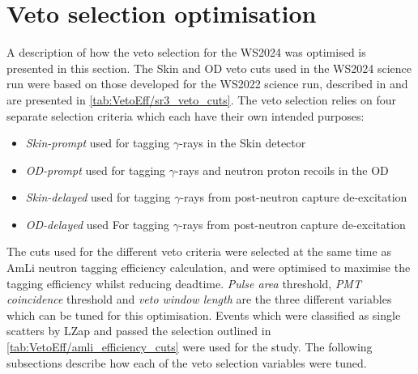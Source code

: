 \section{Veto selection optimisation}\label{sec:VetoEff/VetoSelectionOptimisation}
A description of how the veto selection for the WS2024 was optimised is presented in this section. The Skin and OD veto cuts used in the WS2024 science run were based on those developed for the WS2022 science run, described in \cite{LZCollaboration:2024lux} and are presented in \autoref{tab:VetoEff/sr3_veto_cuts}.
The veto selection relies on four separate selection criteria which each have their own intended purposes:
\begin{itemize}
	\item \textit{Skin-prompt} used for tagging $\gamma$-rays in the Skin detector
	\item \textit{OD-prompt} used for tagging $\gamma$-rays and neutron proton recoils in the OD
	\item \textit{Skin-delayed} used for tagging $\gamma$-rays from post-neutron capture de-excitation
	\item \textit{OD-delayed} used For tagging $\gamma$-rays from post-neutron capture de-excitation
\end{itemize}
The cuts used for the different veto criteria were selected at the same time as AmLi neutron tagging efficiency calculation, and were optimised to maximise the tagging efficiency whilst reducing deadtime. \textit{Pulse area} threshold, \textit{PMT coincidence} threshold and \textit{veto window length} are the three different variables which can be tuned for this optimisation. Events which were classified as single scatters by LZap and passed the selection outlined in \autoref{tab:VetoEff/amli_efficiency_cuts} were used for the study. The following subsections describe how each of the veto selection variables were tuned.

\begin{table}[!ht]
	\centering
	\caption{Outline of cuts applied to AmLi calibration data for determining the veto efficiency. All cuts are defined in \autoref{tab:App_VetoEff/CoreCuts}.}
	\label{tab:VetoEff/amli_efficiency_cuts}
\end{table}

